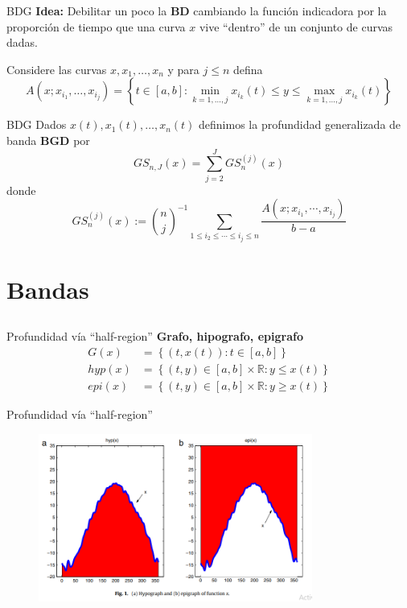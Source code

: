 \documentclass[10pt]{beamer}
\begin{document}
{{\begin{frame}{BDG}
    \textbf{Idea:} Debilitar un poco la \textbf{BD} cambiando la función indicadora por la proporción de tiempo que una curva $x$ vive ``dentro'' de un conjunto de curvas dadas. 
    
    Considere las curvas $x,x_1,\ldots, x_n$ y para $j\leq n$ defina 
    $$A(x;x_{i_1},\ldots, x_{i_j})=\left\{t\in[a,b]:\min_{k=1,\ldots,j}x_{i_k}(t)\leq y\leq \max_{k=1,\ldots,j}x_{i_k}(t) \right\}$$
\end{frame}

\begin{frame}{BDG}
    Dados $x(t),x_1(t),\ldots,x_n(t)$ definimos la profundidad generalizada de banda \textbf{BGD} por
    $$GS_{n,J}(x)=\sum_{j=2}^{J}GS_{n}^{(j)}(x)$$    
    donde 
    $$GS_n^{(j)}(x):=\binom{n}{j}^{-1}\sum_{1\leq i_2\leq \cdots \leq i_j\leq n}\frac{A(x;x_{i_1},\cdots,x_{i_j})}{b-a}$$
\end{frame}

\section[Profundidad vía ``half-region'']{Bandas}
\subsection{}

\begin{frame}{Profundidad vía ``half-region''}
\textbf{Grafo, hipografo, epigrafo}
    \begin{align*}
        G(x)&=\left\{(t,x(t)):t\in[a,b]\right\}\\[0.4cm]
        hyp(x)&=\left\{(t,y)\in [a,b]\times \mathbb{R}:y\leq x(t)\right\}\\[0.4 cm]
        epi(x)&=\left\{(t,y)\in [a,b]\times \mathbb{R}:y\geq x(t)\right\}
    \end{align*}
\end{frame}

\begin{frame}{Profundidad vía ``half-region''}
    \begin{figure}
        \centering
        \includegraphics[width=9cm]{Picture1.png}
    \end{figure}
\end{frame}

}}
\end{document}
